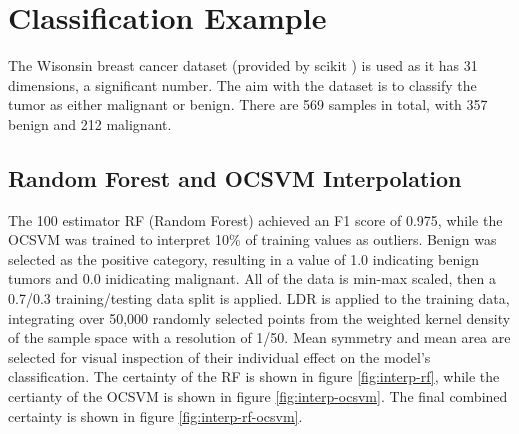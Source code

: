 \documentclass[a4paper, twocolumn]{article}
\begin{document}
\section{Classification Example}

The Wisonsin breast cancer dataset \cite{breast-cancer} (provided by scikit \cite{scikit-learn}) is used as it has 31 dimensions, a significant number. The aim with the dataset is to classify the tumor as either malignant or benign. There are 569 samples in total, with 357 benign and 212 malignant.

\subsection{Random Forest and OCSVM Interpolation}

The 100 estimator RF (Random Forest) \cite{random-forest} achieved an F1 score of 0.975, while the OCSVM was trained to interpret 10\% of training values as outliers. Benign was selected as the positive category, resulting in a value of 1.0 indicating benign tumors and 0.0 inidicating malignant. All of the data is min-max scaled, then a 0.7/0.3 training/testing data split is applied. LDR is applied to the training data, integrating over 50,000 randomly selected points from the weighted kernel density of the sample space with a resolution of 1/50. Mean symmetry and mean area are selected for visual inspection of their individual effect on the model's classification. The certainty of the RF is shown in figure \ref{fig:interp-rf}, while the certianty of the OCSVM is shown in figure \ref{fig:interp-ocsvm}. The final combined certainty is shown in figure \ref{fig:interp-rf-ocsvm}.
\end{document}
